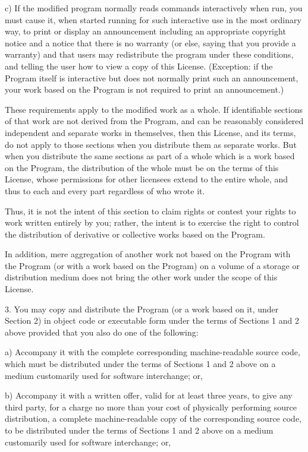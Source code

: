 \documentclass{doc}
\begin{document}
    c) If the modified program normally reads commands interactively
    when run, you must cause it, when started running for such
    interactive use in the most ordinary way, to print or display an
    announcement including an appropriate copyright notice and a
    notice that there is no warranty (or else, saying that you provide
    a warranty) and that users may redistribute the program under
    these conditions, and telling the user how to view a copy of this
    License.  (Exception: if the Program itself is interactive but
    does not normally print such an announcement, your work based on
    the Program is not required to print an announcement.)

These requirements apply to the modified work as a whole.  If
identifiable sections of that work are not derived from the Program,
and can be reasonably considered independent and separate works in
themselves, then this License, and its terms, do not apply to those
sections when you distribute them as separate works.  But when you
distribute the same sections as part of a whole which is a work based
on the Program, the distribution of the whole must be on the terms of
this License, whose permissions for other licensees extend to the
entire whole, and thus to each and every part regardless of who wrote it.

Thus, it is not the intent of this section to claim rights or contest
your rights to work written entirely by you; rather, the intent is to
exercise the right to control the distribution of derivative or
collective works based on the Program.

In addition, mere aggregation of another work not based on the Program
with the Program (or with a work based on the Program) on a volume of
a storage or distribution medium does not bring the other work under
the scope of this License.

  3. You may copy and distribute the Program (or a work based on it,
under Section 2) in object code or executable form under the terms of
Sections 1 and 2 above provided that you also do one of the following:

    a) Accompany it with the complete corresponding machine-readable
    source code, which must be distributed under the terms of Sections
    1 and 2 above on a medium customarily used for software interchange; or,

    b) Accompany it with a written offer, valid for at least three
    years, to give any third party, for a charge no more than your
    cost of physically performing source distribution, a complete
    machine-readable copy of the corresponding source code, to be
    distributed under the terms of Sections 1 and 2 above on a medium
    customarily used for software interchange; or,
\end{document}
